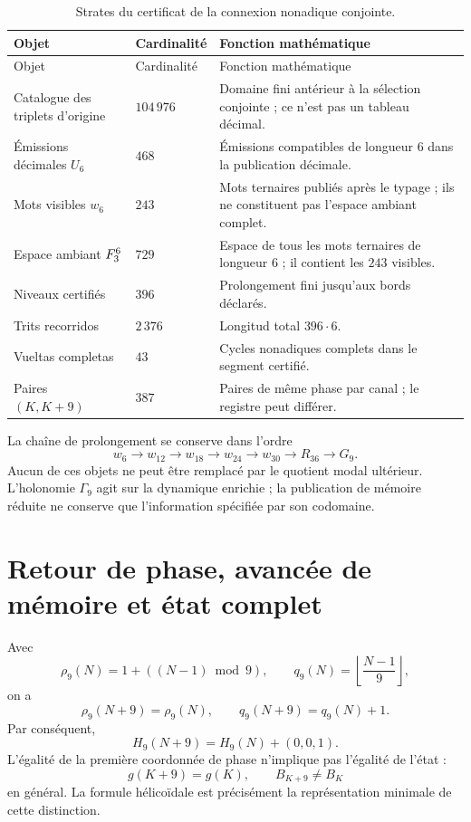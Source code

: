 \begin{longtable}{p{}p{}p{}}
\caption{Strates du certificat de la connexion nonadique conjointe.}
\label{espiral:tab:certificado-nonadico}\\
\toprule
Objet&Cardinalité&Fonction mathématique\\
\midrule
\endfirsthead
\toprule
Objet&Cardinalité&Fonction mathématique\\
\midrule
\endhead
Catalogue des triplets d'origine&\(104\,976\)&Domaine fini antérieur à la sélection conjointe ; ce n'est pas un tableau décimal.\\
Émissions décimales \(U_6\)&\(468\)&Émissions compatibles de longueur \(6\) dans la publication décimale.\\
Mots visibles \(w_6\)&\(243\)&Mots ternaires publiés après le typage ; ils ne constituent pas l'espace ambiant complet.\\
Espace ambiant \(F_3^6\)&\(729\)&Espace de tous les mots ternaires de longueur \(6\) ; il contient les \(243\) visibles.\\
Niveaux certifiés&\(396\)&Prolongement fini jusqu'aux bords déclarés.\\
Trits recorridos&\(2\,376\)&Longitud total \(396\cdot6\).\\
Vueltas completas&\(43\)&Cycles nonadiques complets dans le segment certifié.\\
Paires \((K,K+9)\)&\(387\)&Paires de même phase par canal ; le registre peut différer.\\
\bottomrule
\end{longtable}

La chaîne de prolongement se conserve dans l'ordre
\[
 w_6\longrightarrow w_{12}\longrightarrow w_{18}
 \longrightarrow w_{24}\longrightarrow w_{30}
 \longrightarrow R_{36}\longrightarrow G_9.
\]
Aucun de ces objets ne peut être remplacé par le quotient modal ultérieur. L'holonomie \(\Gamma_9\) agit sur la dynamique enrichie ; la publication de mémoire réduite ne conserve que l'information spécifiée par son codomaine.

\section{Retour de phase, avancée de mémoire et état complet}

Avec
\[
 \rho_9(N)=1+((N-1)\bmod9),
 \qquad
 q_9(N)=\left\lfloor\frac{N-1}{9}\right\rfloor,
\]
on a
\[
 \rho_9(N+9)=\rho_9(N),
 \qquad q_9(N+9)=q_9(N)+1.
\]
Par conséquent,
\[
 H_9(N+9)=H_9(N)+(0,0,1).
\]
L'égalité de la première coordonnée de phase n'implique pas l'égalité de l'état :
\[
 g(K+9)=g(K),
 \qquad B_{K+9}\neq B_K
\]
en général. La formule hélicoïdale est précisément la représentation minimale de cette distinction.

